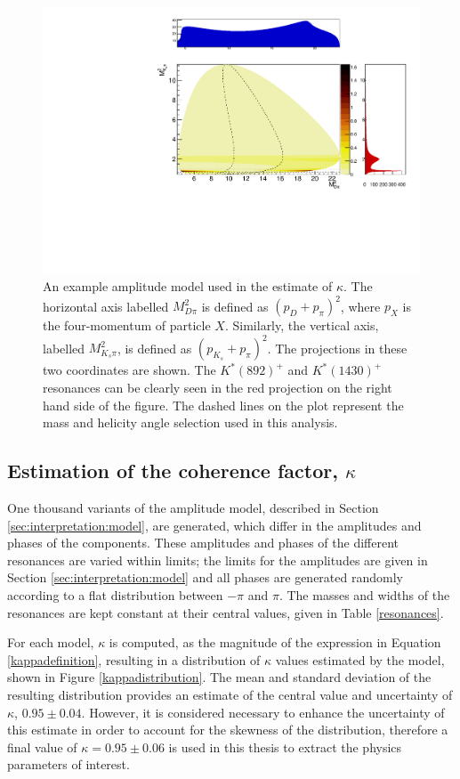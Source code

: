 \begin{figure}[h]
\centering
\includegraphics[width=0.8\linewidth]{figures/results/dalitz.pdf}
\caption{An example amplitude model used in the estimate of $\kappa$. The horizontal axis labelled $M_{D\pi}^2$ is defined as $(p_D + p_{\pi})^2$, where $p_{X}$ is the four-momentum of particle $X$. Similarly, the vertical axis, labelled $M_{K_s\pi}^2$, is defined as $(p_{K_s} + p_{\pi})^2$. The projections in these two coordinates are shown. The $K^*(892)^+$ and $K^*(1430)^+$ resonances can be clearly seen in the red projection on the right hand side of the figure. The dashed lines on the plot represent the \Kstar mass and \KS helicity angle selection used in this analysis.}
\label{dalitzplot}
\end{figure}

\subsection{Estimation of the coherence factor, $\kappa$}
\label{sec:interpretation:kappa}

One thousand variants of the amplitude model, described in Section \ref{sec:interpretation:model}, are generated, which differ in the amplitudes and phases of the components. These amplitudes and phases of the different resonances are varied within limits; the limits for the amplitudes are given in Section \ref{sec:interpretation:model} and all phases are generated randomly according to a flat distribution between $-\pi$ and $\pi$. The masses and widths of the resonances are kept constant at their central values, given in Table \ref{resonances}. 

For each model, $\kappa$ is computed, as the magnitude of the expression in Equation \ref{kappadefinition}, resulting in a distribution of $\kappa$ values estimated by the model, shown in Figure \ref{kappadistribution}. The mean and standard deviation of the resulting distribution provides an estimate of the central value and uncertainty of $\kappa$,  $0.95 \pm 0.04$. However, it is considered necessary to enhance the uncertainty of this estimate in order to account for the skewness of the distribution, therefore a final value of $\kappa = 0.95 \pm 0.06$ is used in this thesis to extract the physics parameters of interest.

